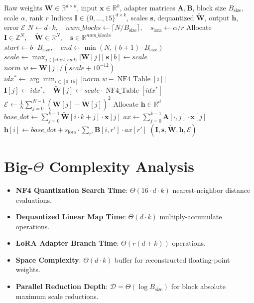 \documentclass[11pt,a4paper]{article}
\theoremstyle{definition}
\begin{document}
\begin{algorithm}[H]
\caption{QLoRA NF4 Block Quantization, Dequantization, and Forward Map}
\begin{algorithmic}[1]
\Require Raw weights $\mathbf{W} \in \mathbb{R}^{d \times k}$, input $\mathbf{x} \in \mathbb{R}^k$, adapter matrices $\mathbf{A}, \mathbf{B}$, block size $B_{\text{size}}$, scale $\alpha$, rank $r$
\Ensure Indices $\mathbf{I} \in \{0, \dots, 15\}^{d \times k}$, scales $\mathbf{s}$, dequantized $\tilde{\mathbf{W}}$, output $\mathbf{h}$, error $\mathcal{E}$
\State $N \gets d \cdot k, \quad num\_blocks \gets \lceil N / B_{\text{size}} \rceil, \quad s_{\text{lora}} \gets \alpha / r$
\State Allocate $\mathbf{I} \in \mathbb{Z}^N, \quad \tilde{\mathbf{W}} \in \mathbb{R}^N, \quad \mathbf{s} \in \mathbb{R}^{num\_blocks}$
    \State $start \gets b \cdot B_{\text{size}}, \quad end \gets \min(N, (b + 1) \cdot B_{\text{size}})$
    \State $scale \gets \max_{j \in [start, end)} |\mathbf{W}[j]|$
    \State $\mathbf{s}[b] \gets scale$
        \State $norm\_w \gets \mathbf{W}[j] / (scale + 10^{-12})$
        \State $idx^* \gets \arg\min_{i \in [0, 15]} |norm\_w - \operatorname{NF4\_Table}[i]|$
        \State $\mathbf{I}[j] \gets idx^*, \quad \tilde{\mathbf{W}}[j] \gets scale \cdot \operatorname{NF4\_Table}[idx^*]$
    \EndFor
\EndFor
\State $\mathcal{E} \gets \frac{1}{N}\sum_{j=0}^{N-1} (\mathbf{W}[j] - \tilde{\mathbf{W}}[j])^2$
\State Allocate $\mathbf{h} \in \mathbb{R}^d$
    \State $base\_dot \gets \sum_{j=0}^{k-1} \tilde{\mathbf{W}}[i \cdot k + j] \cdot \mathbf{x}[j]$
    \State $ax \gets \sum_{j=0}^{k-1} \mathbf{A}[\cdot, j] \cdot \mathbf{x}[j]$
    \State $\mathbf{h}[i] \gets base\_dot + s_{\text{lora}} \cdot \sum_{r'} \mathbf{B}[i, r'] \cdot ax[r']$
\EndFor
\State \Return $(\mathbf{I}, \mathbf{s}, \tilde{\mathbf{W}}, \mathbf{h}, \mathcal{E})$
\end{algorithmic}
\end{algorithm}

\section{Big-$\Theta$ Complexity Analysis}

\begin{itemize}
    \item \textbf{NF4 Quantization Search Time}: $\Theta(16 \cdot d \cdot k)$ nearest-neighbor distance evaluations.
    \item \textbf{Dequantized Linear Map Time}: $\Theta(d \cdot k)$ multiply-accumulate operations.
    \item \textbf{LoRA Adapter Branch Time}: $\Theta(r(d + k))$ operations.
    \item \textbf{Space Complexity}: $\Theta(d \cdot k)$ buffer for reconstructed floating-point weights.
    \item \textbf{Parallel Reduction Depth}: $\mathcal{D} = \Theta(\log B_{\text{size}})$ for block absolute maximum scale reductions.
\end{itemize}
\end{document}
